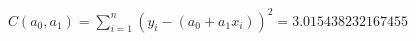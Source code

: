 \documentclass[preview]{standalone}
\begin{document}
\begin{align*}
C(a_0, a_1) = \sum_{i=1}^{n} (y_i - (a_0 + a_1x_i))^2 =3.015438232167455
\end{align*}
\end{document}
